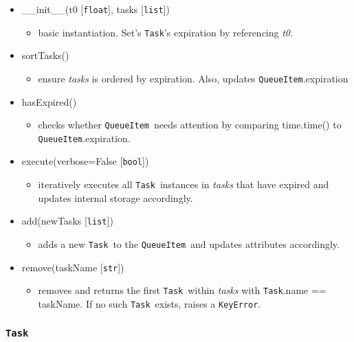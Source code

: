 \documentclass{article}
\newcommand{\QueueItem}{\texttt{QueueItem}}
\newcommand{\Task}{\texttt{Task}}
\newcommand{\pythonfloat}{\texttt{float}}
\newcommand{\pythonstr}{\texttt{str}}
\newcommand{\pythonbool}{\texttt{bool}}
\newcommand{\pythonlist}{\texttt{list}}
\begin{document}
\begin{itemize}
    \item{\_\_init\_\_(t0 [\pythonfloat], tasks [\pythonlist])
        \begin{itemize}
            \item{basic instantiation. Set's \Task's expiration by referencing \textit{t0}.}
        \end{itemize}
         }
    \item{sortTasks()
        \begin{itemize}
            \item{ensure \textit{tasks} is ordered by expiration. Also, updates \QueueItem.expiration}
        \end{itemize}
         }
    \item{hasExpired()
        \begin{itemize}
            \item{checks whether \QueueItem~needs attention by comparing time.time() to \QueueItem.expiration.}
        \end{itemize}
         }
    \item{execute(verbose=False [\pythonbool])
        \begin{itemize}
            \item{iteratively executes all \Task~instances in \textit{tasks} that have expired and updates internal storage accordingly.}
        \end{itemize}
         }
    \item{add(newTasks [\pythonlist])
        \begin{itemize}
            \item{adds a new \Task~to the \QueueItem~and updates attributes accordingly.}
        \end{itemize}
         }
    \item{remove(taskName [\pythonstr])
        \begin{itemize}
            \item{removes and returns the first \Task~within \textit{tasks} with \Task.name == taskName. If no such \Task~exists, raises a \texttt{KeyError}.}
        \end{itemize}
         }
\end{itemize}


\subsubsection{\Task}
\label{sec: Task}
\end{document}
